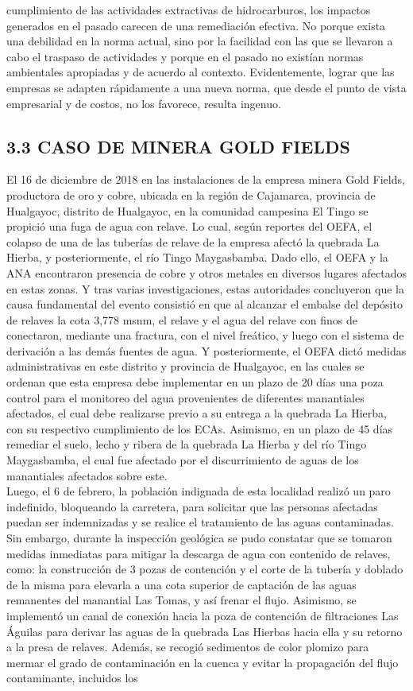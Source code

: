 \documentclass[12pt, a4paper]{article} %
\begin{document}
\begin{multicols}{2}
cumplimiento de las actividades extractivas de hidrocarburos, los impactos generados en el pasado carecen de una remediación efectiva. No porque exista una debilidad en la norma actual, sino por la facilidad con las que se llevaron a cabo el traspaso de actividades y porque en el pasado no existían normas ambientales apropiadas y de acuerdo al contexto. Evidentemente, lograr que las empresas se adapten rápidamente a una nueva norma, que desde el punto de vista empresarial y de costos, no los favorece, resulta ingenuo.
            \subsection*{3.3 CASO DE MINERA GOLD FIELDS}
            El 16 de diciembre de 2018 en las instalaciones de la empresa minera Gold Fields, productora de oro y cobre, ubicada en la región de Cajamarca, provincia de Hualgayoc, distrito de Hualgayoc, en la comunidad campesina El Tingo se propició una fuga de agua con relave. Lo cual, según reportes del OEFA, el colapso de una de las tuberías de relave de la empresa afectó la quebrada La Hierba, y posteriormente, el río Tingo Maygasbamba. Dado ello, el OEFA y la ANA encontraron presencia de cobre y otros metales en diversos lugares afectados en estas zonas. Y tras varias investigaciones, estas autoridades concluyeron que la causa fundamental del evento consistió en que al alcanzar el embalse del depósito de relaves la cota 3,778 msnm, el relave y el agua del relave con finos de conectaron, mediante una fractura, con el nivel freático, y luego con el sistema de derivación a las demás fuentes de agua. Y posteriormente, el OEFA dictó medidas administrativas en este distrito y provincia de Hualgayoc, en las cuales se ordenan que esta empresa debe implementar en un plazo de 20 días una poza control para el monitoreo del agua provenientes de diferentes manantiales afectados, el cual debe realizarse previo a su entrega a la quebrada La Hierba, con su respectivo cumplimiento de los ECAs. Asimismo, en un plazo de 45 días remediar el suelo, lecho y ribera de la quebrada La Hierba y del río Tingo Maygasbamba, el cual fue afectado por el discurrimiento de aguas de los manantiales afectados sobre este. \\Luego, el 6 de febrero, la población indignada de esta localidad realizó un paro indefinido, bloqueando la carretera, para solicitar que las personas afectadas puedan ser indemnizadas y se realice el tratamiento de las aguas contaminadas. Sin embargo, durante la inspección geológica se pudo constatar que se tomaron medidas inmediatas para mitigar la descarga de agua con contenido de relaves, como: la construcción de 3 pozas de contención y el corte de la tubería y doblado de la misma para elevarla a una cota superior de captación de las aguas remanentes del manantial Las Tomas, y así frenar el flujo. Asimismo, se implementó un canal de conexión hacia la poza de contención de filtraciones Las Águilas para derivar las aguas de la quebrada Las Hierbas hacia ella y su retorno a la presa de relaves. Además, se recogió sedimentos de color plomizo para mermar el grado de contaminación en la cuenca y evitar la propagación del flujo contaminante, incluidos los 
\end{multicols}
\end{document}
